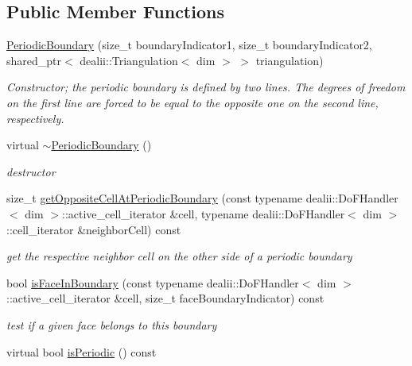 \subsection*{Public Member Functions}
\begin{DoxyCompactItemize}
\item 
\hyperlink{classnatrium_1_1PeriodicBoundary_aac12a26adafba9f31b6fa7b417933340}{Periodic\-Boundary} (size\-\_\-t boundary\-Indicator1, size\-\_\-t boundary\-Indicator2, shared\-\_\-ptr$<$ dealii\-::\-Triangulation$<$ dim $>$ $>$ triangulation)
\begin{DoxyCompactList}\small\item\em Constructor; the periodic boundary is defined by two lines. The degrees of freedom on the first line are forced to be equal to the opposite one on the second line, respectively. \end{DoxyCompactList}\item 
\hypertarget{classnatrium_1_1PeriodicBoundary_ae71c1a8ea1f1f9e29be8ab6496125a5c}{virtual \hyperlink{classnatrium_1_1PeriodicBoundary_ae71c1a8ea1f1f9e29be8ab6496125a5c}{$\sim$\-Periodic\-Boundary} ()}\label{classnatrium_1_1PeriodicBoundary_ae71c1a8ea1f1f9e29be8ab6496125a5c}

\begin{DoxyCompactList}\small\item\em destructor \end{DoxyCompactList}\item 
size\-\_\-t \hyperlink{classnatrium_1_1PeriodicBoundary_ac790bcd5edc7fc6e009c6e93019c8f13}{get\-Opposite\-Cell\-At\-Periodic\-Boundary} (const typename dealii\-::\-Do\-F\-Handler$<$ dim $>$\-::active\-\_\-cell\-\_\-iterator \&cell, typename dealii\-::\-Do\-F\-Handler$<$ dim $>$\-::cell\-\_\-iterator \&neighbor\-Cell) const 
\begin{DoxyCompactList}\small\item\em get the respective neighbor cell on the other side of a periodic boundary \end{DoxyCompactList}\item 
bool \hyperlink{classnatrium_1_1PeriodicBoundary_a80e5b08192d3e5ebe3ad0489966b4433}{is\-Face\-In\-Boundary} (const typename dealii\-::\-Do\-F\-Handler$<$ dim $>$\-::active\-\_\-cell\-\_\-iterator \&cell, size\-\_\-t face\-Boundary\-Indicator) const 
\begin{DoxyCompactList}\small\item\em test if a given face belongs to this boundary \end{DoxyCompactList}\item 
\hypertarget{classnatrium_1_1PeriodicBoundary_a38c5e966e4b2a1ee185a5634fc379393}{virtual bool \hyperlink{classnatrium_1_1PeriodicBoundary_a38c5e966e4b2a1ee185a5634fc379393}{is\-Periodic} () const }\label{classnatrium_1_1PeriodicBoundary_a38c5e966e4b2a1ee185a5634fc379393}


\end{DoxyCompactItemize}
